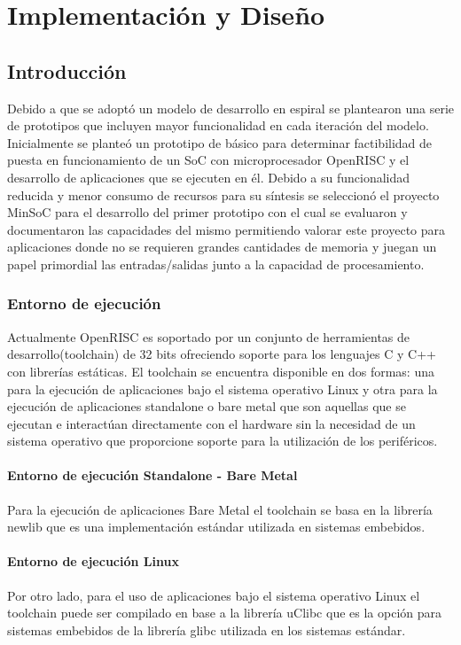 \chapter{Implementación y Diseño}
	\section{Introducción}
	Debido a que se adoptó un modelo de desarrollo en espiral se plantearon una serie de prototipos que incluyen mayor funcionalidad en cada iteración
	del modelo. Inicialmente se planteó un prototipo de básico para determinar factibilidad de puesta en funcionamiento de un SoC con microprocesador
	OpenRISC y el desarrollo de aplicaciones que se ejecuten en él. Debido a su funcionalidad reducida y menor consumo de recursos  para su síntesis se
	seleccionó el proyecto MinSoC para el desarrollo del primer prototipo con el cual se evaluaron y documentaron las capacidades del mismo permitiendo
	valorar este proyecto para aplicaciones donde no se requieren grandes cantidades de memoria y juegan un papel primordial las entradas/salidas junto
	a la capacidad de procesamiento.  
		 
		\subsection{Entorno de ejecución}
		Actualmente OpenRISC es soportado por un conjunto de herramientas de desarrollo(toolchain) de 32 bits ofreciendo soporte para los lenguajes C y C++
		con librerías estáticas. El toolchain se encuentra disponible en dos formas: una para la ejecución de aplicaciones bajo el sistema operativo Linux y
		otra para la ejecución de aplicaciones standalone o bare metal que son aquellas que se ejecutan e interactúan directamente con el hardware sin la
		necesidad de un sistema operativo que proporcione soporte para la utilización de los periféricos.
		
			\subsubsection{Entorno de ejecución Standalone - Bare Metal}
	    	Para la ejecución de aplicaciones Bare Metal el toolchain se basa en la librería newlib que es una implementación estándar utilizada en
	    	sistemas embebidos. 
	    
			\subsubsection{Entorno de ejecución Linux}
			Por otro lado, para el uso de aplicaciones bajo el sistema operativo Linux el toolchain puede ser compilado en base a la librería uClibc que es la
			opción para sistemas embebidos de la librería glibc utilizada en los sistemas estándar.
		
